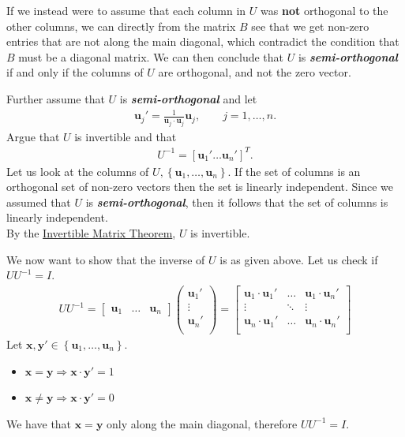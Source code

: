 \documentclass[paper=a4, fontsize=11pt]{scrartcl} %
\numberwithin{equation}{section} %
\numberwithin{figure}{section} %
\numberwithin{table}{section} %
\theoremstyle{definition}
\begin{document}
If we instead were to assume that each column in $U$ was \textbf{not} orthogonal to the other columns, we can directly from the matrix $B$ see that we get
non-zero entries that are not along the main diagonal, which contradict the condition that $B$ must be a diagonal matrix.
We can then conclude that $U$ is \textbf{\textit{semi-orthogonal}} if and only if the columns of $U$ are orthogonal, and not the zero vector.

Further assume that $U$ is \textbf{\textit{semi-orthogonal}} and let
\begin{align*}
  \mathbf{u}_j' = \frac{1}{\mathbf{u}_j\cdot\mathbf{u}_j}\mathbf{u}_j, \qquad j = 1,\dots,n.
\end{align*}
Argue that $U$ is invertible and that
\begin{align*}
  U^{-1} = \left[ \mathbf{u}_1' \dots \mathbf{u}_n' \right]^T.
\end{align*}
Let us look at the columns of $U, \left\{ \mathbf{u}_1,\dots,\mathbf{u}_n \right\}$.
If the set of columns is an orthogonal set of non-zero vectors then the set is linearly independent.
Since we assumed that $U$ is \textit{\textbf{semi-orthogonal}}, then it follows that the set of columns is linearly independent.\\
By the \underline{Invertible Matrix Theorem}, $U$ is invertible.

We now want to show that the inverse of $U$ is as given above.
Let us check if $UU^{-1} = I$.
\begin{align*}
  UU^{-1} = \begin{bmatrix}
	\mathbf{u}_1 & \hdots & \mathbf{u}_n
  \end{bmatrix} \begin{pmatrix}
	\mathbf{u}_1'\\
	\vdots\\
	\mathbf{u}_n'\\
  \end{pmatrix} = \begin{bmatrix}
	\mathbf{u}_1\cdot\mathbf{u}_1' & \hdots & \mathbf{u}_1\cdot\mathbf{u}_n'\\
	\vdots & \ddots & \vdots \\
	\mathbf{u}_n\cdot\mathbf{u}_1' & \hdots & \mathbf{u}_n\cdot\mathbf{u}_n'\\
  \end{bmatrix}
\end{align*}
Let $\mathbf{x}, \mathbf{y}' \in \left\{ \mathbf{u}_1, \dots, \mathbf{u}_n \right\}$.\\
\begin{itemize}
  \item $\mathbf{x} = \mathbf{y} \Rightarrow \mathbf{x}\cdot\mathbf{y}' = 1$
  \item $\mathbf{x} \neq \mathbf{y} \Rightarrow \mathbf{x}\cdot\mathbf{y}' = 0$
\end{itemize}
We have that $\mathbf{x} = \mathbf{y}$ only along the main diagonal, therefore $UU^{-1} = I$.
\end{document}
